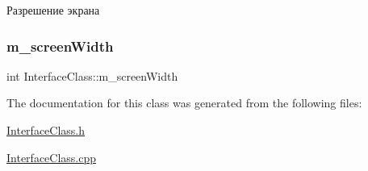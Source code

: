 Разрешение экрана 

\mbox{\label{class_interface_class_aab88d46230f91d664b0c97c8e8c1e00e}} 
\subsubsection{\texorpdfstring{m\+\_\+screen\+Width}{m\_screenWidth}}
{\footnotesize\ttfamily int Interface\+Class\+::m\+\_\+screen\+Width\hspace{0.3cm}{\ttfamily [private]}}



The documentation for this class was generated from the following files\+:\begin{DoxyCompactItemize}
\item 
\hyperlink{_interface_class_8h}{Interface\+Class.\+h}\item 
\hyperlink{_interface_class_8cpp}{Interface\+Class.\+cpp}\end{DoxyCompactItemize}
